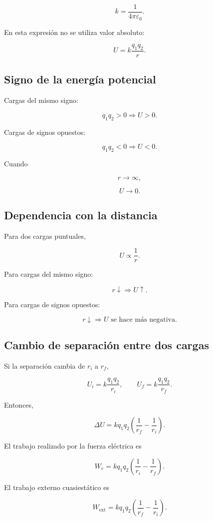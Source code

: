 \[
\boxed{
k=\frac{1}{4\pi\varepsilon_0}
}.
\]

En esta expresión no se utiliza valor absoluto:

\[
\boxed{
U=k\frac{q_1q_2}{r}
}.
\]


\subsection{Signo de la energía potencial}

Cargas del mismo signo:

\[
q_1q_2>0
\Longrightarrow
\boxed{U>0}.
\]

Cargas de signos opuestos:

\[
q_1q_2<0
\Longrightarrow
\boxed{U<0}.
\]

Cuando

\[
r\to\infty,
\]

\[
\boxed{U\to0}.
\]


\subsection{Dependencia con la distancia}

Para dos cargas puntuales,

\[
\boxed{
U\propto\frac{1}{r}
}.
\]

Para cargas del mismo signo:

\[
r\downarrow
\Longrightarrow
U\uparrow.
\]

Para cargas de signos opuestos:

\[
r\downarrow
\Longrightarrow
U\text{ se hace más negativa}.
\]


\subsection{Cambio de separación entre dos cargas}

Si la separación cambia de \(r_i\) a \(r_f\),

\[
U_i=k\frac{q_1q_2}{r_i},
\qquad
U_f=k\frac{q_1q_2}{r_f}.
\]

Entonces,

\[
\boxed{
\Delta U
=
kq_1q_2
\left(
\frac{1}{r_f}
-
\frac{1}{r_i}
\right)
}.
\]

El trabajo realizado por la fuerza eléctrica es

\[
\boxed{
W_e
=
kq_1q_2
\left(
\frac{1}{r_i}
-
\frac{1}{r_f}
\right)
}.
\]

El trabajo externo cuasiestático es

\[
\boxed{
W_{\text{ext}}
=
kq_1q_2
\left(
\frac{1}{r_f}
-
\frac{1}{r_i}
\right)
}.
\]


